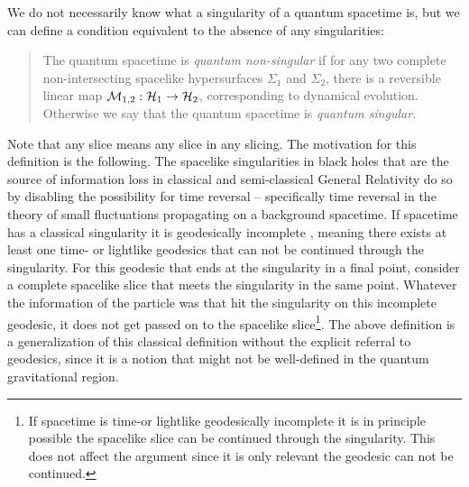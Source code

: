 \documentclass[12pt]{article}
\begin{document}
We do not necessarily know what a singularity of a quantum spacetime is, but we can define a condition equivalent to the absence of any singularities:

\begin{quotation}

The quantum spacetime  is {\it quantum non-singular} if for any two complete non-intersecting spacelike hypersurfaces $\Sigma_1$ and $\Sigma_2$, there is a reversible linear map ${\cal M}_{1,2} : {\cal H}_1 \rightarrow {\cal H}_2 $, corresponding to dynamical evolution.   
Otherwise we say that the quantum spacetime is {\it quantum singular}.

\end{quotation}

Note that any slice means any slice in any slicing. The motivation for this definition is the following. 
The spacelike singularities in black holes that are the source of information loss in 
classical and semi-classical General Relativity do so by disabling the possibility for time reversal -- specifically time reversal in the theory of
small fluctuations propagating on a background spacetime.  If spacetime has a classical singularity it is geodesically incomplete \cite{HawkingEllis}, 
meaning there exists at least one time- or lightlike geodesics that can not be continued through the singularity. For this geodesic that ends at the singularity in a final point, 
consider a complete spacelike slice that meets the singularity in the same point. Whatever the information of the particle was that hit the singularity
on this incomplete geodesic, it does not get passed on to the spacelike slice\footnote{If spacetime is time-or lightlike geodesically incomplete it is in principle possible the spacelike slice can be continued through the singularity. This does not affect the argument since
it is only relevant the geodesic can not be continued.}. The above definition is a generalization of this classical definition without the
explicit referral to geodesics, since it is a notion that might not be well-defined in the quantum gravitational region.
\end{document}
